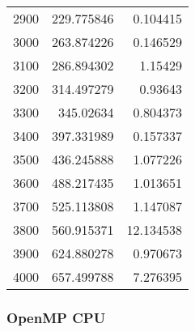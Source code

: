\begin{longtable}{r r r}
2900 & 229.775846 & 0.104415 \\
3000 & 263.874226 & 0.146529 \\
3100 & 286.894302 & 1.15429 \\
3200 & 314.497279 & 0.93643 \\
3300 & 345.02634 & 0.804373 \\
3400 & 397.331989 & 0.157337 \\
3500 & 436.245888 & 1.077226 \\
3600 & 488.217435 & 1.013651 \\
3700 & 525.113808 & 1.147087 \\
3800 & 560.915371 & 12.134538 \\
3900 & 624.880278 & 0.970673 \\
4000 & 657.499788 & 7.276395 \\
\end{longtable}

\subsubsection{OpenMP CPU}

